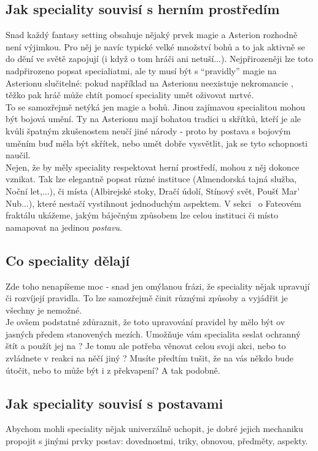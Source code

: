 \documentclass[../main.tex]{subfiles}
\begin{document}
\subsection{Jak speciality souvisí s herním prostředím}
\label{sec:spec-prvky}

Snad každý fantasy setting obsahuje nějaký prvek magie a Asterion rozhodně není výjimkou. Pro něj je navíc typické velké množství bohů a to jak aktivně se do dění ve světě zapojují (i když o tom hráči ani netuší...). Nejpřirozeněji lze toto nadpřirozeno popsat specialiatmi, ale ty musí být s ``pravidly'' magie na Asterionu slučitelné: pokud například na Asterionu neexistuje nekromancie , těžko pak hráč může chtít pomocí speciality umět oživovat mrtvé.\\
To se samozřejmě netýká jen magie a bohů. Jinou zajímavou specialitou mohou být bojová umění. Ty na Asterionu mají bohatou tradici u skřítků, kteří je ale kvůli špatným zkušenostem neučí jiné národy - proto by postava s bojovým uměním buď měla být skřítek, nebo umět dobře vysvětlit, jak se tyto schopnosti naučil.\\
Nejen, že by měly speciality respektovat herní prostředí, mohou z něj dokonce vznikat. Tak lze elegantně popsat různé instituce (Almendorská tajná služba, Noční let,...), či místa (Albirejské stoky, Dračí údolí, Stínový svět, Poušť Mar' Nub...), které nestačí vystihnout jednoduchým aspektem. V sekci~ o Fateovém fraktálu ukážeme, jakým báječným způsobem lze celou instituci či místo namapovat na jedinou \textit{postavu}.

\subsection{Co speciality dělají}
\label{sec:spec-delaji}
Zde toho nenapíšeme moc - snad jen omýlanou frázi, že speciality nějak upravují či rozvíjejí pravidla. To lze samozřejmě činit různými způsoby a vyjádřit je všechny je nemožné. \\
Je ovšem podstatné zdůraznit, že toto upravování pravidel by mělo být ov jasných předem stanovených mezích. Umožňuje vám specialita seslat ochranný štít a použít jej na ? Je tomu ale potřeba věnovat celou svoji akci, nebo to zvládnete v reakci na něčí jiný ? Musíte předtím tušit, že na vás někdo bude útočit, nebo to může být i z překvapení? A tak podobně.

\subsection{Jak speciality souvisí s postavami}
\label{sec:spec-postavy}
Abychom mohli speciality nějak univerzálně uchopit, je dobré jejich mechaniku propojit s jinými prvky postav: dovednostmi, triky, obnovou, předměty, aspekty.
\end{document}
